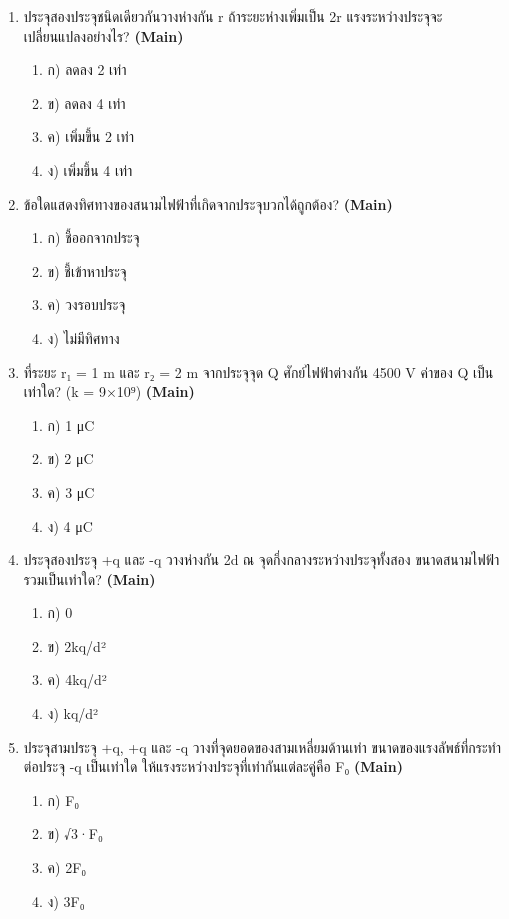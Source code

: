 \documentclass[12pt]{article}
\begin{document}
\begin{enumerate}[label=\arabic*.]
\item ประจุสองประจุชนิดเดียวกันวางห่างกัน r ถ้าระยะห่างเพิ่มเป็น 2r แรงระหว่างประจุจะเปลี่ยนแปลงอย่างไร? \hfill \textbf{\small (Main)}
\begin{enumerate}[label=)]
\item ก) ลดลง 2 เท่า
\item ข) ลดลง 4 เท่า
\item ค) เพิ่มขึ้น 2 เท่า
\item ง) เพิ่มขึ้น 4 เท่า
\end{enumerate}
\item ข้อใดแสดงทิศทางของสนามไฟฟ้าที่เกิดจากประจุบวกได้ถูกต้อง? \hfill \textbf{\small (Main)}
\begin{enumerate}[label=)]
\item ก) ชี้ออกจากประจุ
\item ข) ชี้เข้าหาประจุ
\item ค) วงรอบประจุ
\item ง) ไม่มีทิศทาง
\end{enumerate}
\item ที่ระยะ r₁ = 1 m และ r₂ = 2 m จากประจุจุด Q ศักย์ไฟฟ้าต่างกัน 4500 V ค่าของ Q เป็นเท่าใด? (k = 9×10⁹) \hfill \textbf{\small (Main)}
\begin{enumerate}[label=)]
\item ก) 1 μC
\item ข) 2 μC
\item ค) 3 μC
\item ง) 4 μC
\end{enumerate}
\item ประจุสองประจุ +q และ -q วางห่างกัน 2d ณ จุดกึ่งกลางระหว่างประจุทั้งสอง ขนาดสนามไฟฟ้ารวมเป็นเท่าใด? \hfill \textbf{\small (Main)}
\begin{enumerate}[label=)]
\item ก) 0
\item ข) 2kq/d²
\item ค) 4kq/d²
\item ง) kq/d²
\end{enumerate}
\item ประจุสามประจุ +q, +q และ -q วางที่จุดยอดของสามเหลี่ยมด้านเท่า ขนาดของแรงลัพธ์ที่กระทำต่อประจุ -q เป็นเท่าใด ให้แรงระหว่างประจุที่เท่ากันแต่ละคู่คือ F₀ \hfill \textbf{\small (Main)}
\begin{enumerate}[label=)]
\item ก) F₀
\item ข) √3·F₀
\item ค) 2F₀
\item ง) 3F₀
\end{enumerate}

\end{enumerate}
\end{document}
